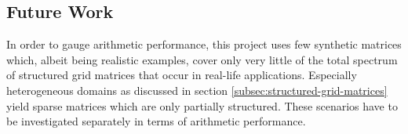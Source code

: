 \documentclass{article}
\begin{document}
  \subsection{Future Work}

    In order to gauge arithmetic performance, this project uses few synthetic matrices which, albeit being realistic examples, cover only very little of the total spectrum of structured grid matrices that occur in real-life applications. Especially heterogeneous domains as discussed in section \ref{subsec:structured-grid-matrices} yield sparse matrices which are only partially structured. These scenarios have to be investigated separately in terms of arithmetic performance.

\printbibliography
\end{document}

